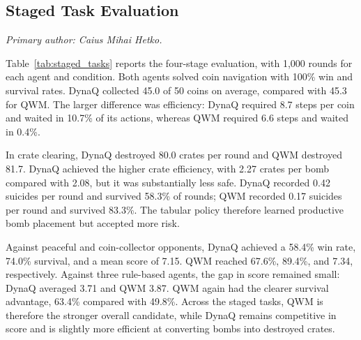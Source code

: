 \documentclass[article, 10pt]{IEEEtran}
\begin{document}
\subsection{Staged Task Evaluation}\label{sec:staged_results}

\textit{Primary author: Caius Mihai Hetko.}

Table~\ref{tab:staged_tasks} reports the four-stage evaluation, with 1,000 rounds for each agent and condition. Both agents solved coin navigation with 100\% win and survival rates. DynaQ collected 45.0 of 50 coins on average, compared with 45.3 for QWM. The larger difference was efficiency: DynaQ required 8.7 steps per coin and waited in 10.7\% of its actions, whereas QWM required 6.6 steps and waited in 0.4\%.

In crate clearing, DynaQ destroyed 80.0 crates per round and QWM destroyed 81.7. DynaQ achieved the higher crate efficiency, with 2.27 crates per bomb compared with 2.08, but it was substantially less safe. DynaQ recorded 0.42 suicides per round and survived 58.3\% of rounds; QWM recorded 0.17 suicides per round and survived 83.3\%. The tabular policy therefore learned productive bomb placement but accepted more risk.

Against peaceful and coin-collector opponents, DynaQ achieved a 58.4\% win rate, 74.0\% survival, and a mean score of 7.15. QWM reached 67.6\%, 89.4\%, and 7.34, respectively. Against three rule-based agents, the gap in score remained small: DynaQ averaged 3.71 and QWM 3.87. QWM again had the clearer survival advantage, 63.4\% compared with 49.8\%. Across the staged tasks, QWM is therefore the stronger overall candidate, while DynaQ remains competitive in score and is slightly more efficient at converting bombs into destroyed crates.

\end{document}
